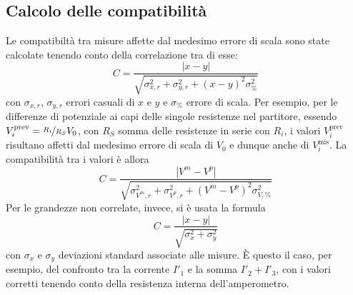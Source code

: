 \documentclass[italian,a4paper]{article}
\begin{document}
\subsection{Calcolo delle compatibilità}
Le compatibiltà tra misure affette dal medesimo errore di scala sono state calcolate tenendo conto della correlazione tra di esse:
$$C=\dfrac{|x-y|}{\sqrt{\sigma^2_{x,r}+\sigma^2_{y,r}+(x-y)^2\sigma^2_\%}}$$
con $\sigma_{x,r}$, $\sigma_{y,r}$ errori casuali di $x$ e $y$ e $\sigma_\%$ errore di scala.
Per esempio, per le differenze di potenziale ai capi delle singole resistenze nel partitore, essendo $V^{\text{prev}}_i=\nicefrac{R_i}{R_S}V_0$, con $R_S$ somma delle resistenze in serie con $R_i$, i valori $V^{\text{prev}}_i$ risultano affetti dal medesimo errore di scala di $V_0$ e dunque anche di $V^{\text{mis}}_i$.
La compatibilità tra i valori è allora  $$C=\dfrac{|V^m-V^p|}{\sqrt{\sigma^2_{V^m,r}+\sigma^2_{V^p,r}+(V^m-V^p)^2\sigma^2_{V,\%}}}$$
Per le grandezze non correlate, invece, si è usata la formula 
$$C=\dfrac{|x-y|}{\sqrt{\sigma^2_x+\sigma^2_y}}$$
con $\sigma_x$ e $\sigma_y$ deviazioni standard associate alle misure.
\`{E} questo il caso, per esempio, del confronto tra la corrente $I'_1$ e la somma $I'_2+I'_3$, con i valori corretti tenendo conto della resistenza interna dell'amperometro.
\end{document}
